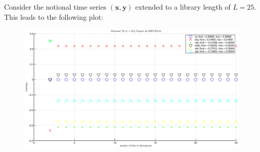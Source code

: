 \documentclass[a4paper,11pt]{article}
\begin{document}
Consider the notional time series $(\mathbf{x},\mathbf{y})$ extended to a library length of $L=25$.  This leads to the following plot:
\begin{figure}
\includegraphics[scale=0.55]{notionalTS.eps}
\end{figure}
\end{document}
